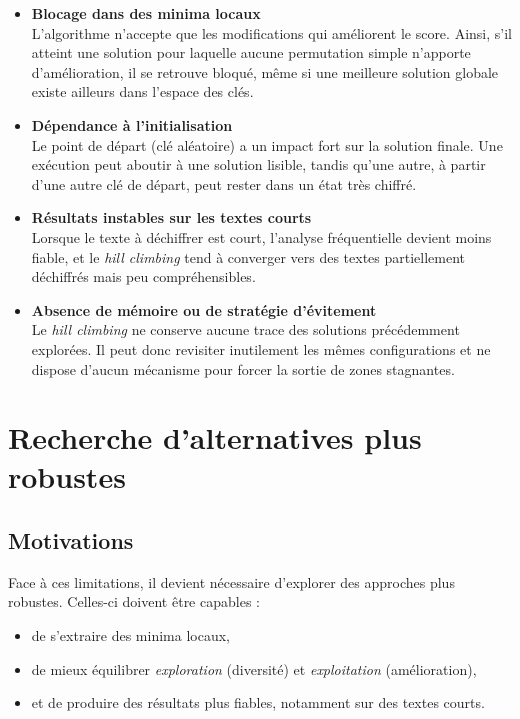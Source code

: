 \documentclass[a4paper]{article}
\begin{document}
\begin{itemize}
    \item \textbf{Blocage dans des minima locaux} \\
    L’algorithme n’accepte que les modifications qui améliorent le score. Ainsi, s’il atteint une solution pour laquelle aucune permutation simple n’apporte d’amélioration, il se retrouve bloqué, même si une meilleure solution globale existe ailleurs dans l’espace des clés.

    \item \textbf{Dépendance à l'initialisation} \\
    Le point de départ (clé aléatoire) a un impact fort sur la solution finale. Une exécution peut aboutir à une solution lisible, tandis qu’une autre, à partir d’une autre clé de départ, peut rester dans un état très chiffré.

    \item \textbf{Résultats instables sur les textes courts} \\
    Lorsque le texte à déchiffrer est court, l’analyse fréquentielle devient moins fiable, et le \textit{hill climbing} tend à converger vers des textes partiellement déchiffrés mais peu compréhensibles.

    \item \textbf{Absence de mémoire ou de stratégie d’évitement} \\
    Le \textit{hill climbing} ne conserve aucune trace des solutions précédemment explorées. Il peut donc revisiter inutilement les mêmes configurations et ne dispose d’aucun mécanisme pour forcer la sortie de zones stagnantes.
\end{itemize}


\section{Recherche d’alternatives plus robustes}

\subsection{Motivations}

Face à ces limitations, il devient nécessaire d’explorer des approches plus robustes. Celles-ci doivent être capables :
\begin{itemize}
    \item de s’extraire des minima locaux,
    \item de mieux équilibrer \textit{exploration} (diversité) et \textit{exploitation} (amélioration),
    \item et de produire des résultats plus fiables, notamment sur des textes courts.
\end{itemize}
\end{document}
